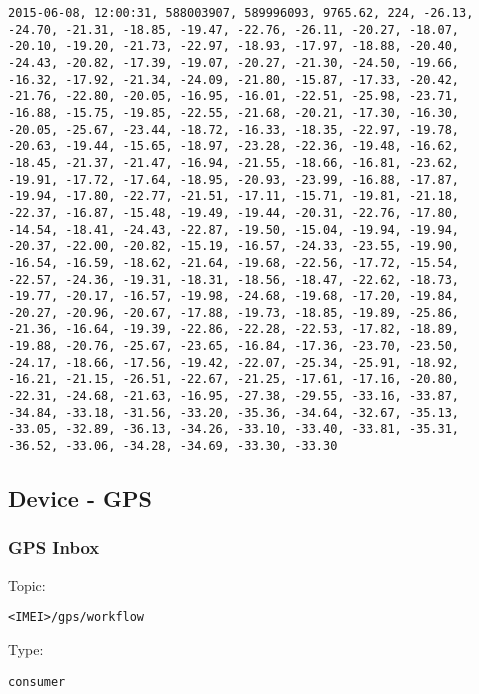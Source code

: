 \begin{lstlisting}
2015-06-08, 12:00:31, 588003907, 589996093, 9765.62, 224, -26.13, -24.70, -21.31, -18.85, -19.47, -22.76, -26.11, -20.27, -18.07, -20.10, -19.20, -21.73, -22.97, -18.93, -17.97, -18.88, -20.40, -24.43, -20.82, -17.39, -19.07, -20.27, -21.30, -24.50, -19.66, -16.32, -17.92, -21.34, -24.09, -21.80, -15.87, -17.33, -20.42, -21.76, -22.80, -20.05, -16.95, -16.01, -22.51, -25.98, -23.71, -16.88, -15.75, -19.85, -22.55, -21.68, -20.21, -17.30, -16.30, -20.05, -25.67, -23.44, -18.72, -16.33, -18.35, -22.97, -19.78, -20.63, -19.44, -15.65, -18.97, -23.28, -22.36, -19.48, -16.62, -18.45, -21.37, -21.47, -16.94, -21.55, -18.66, -16.81, -23.62, -19.91, -17.72, -17.64, -18.95, -20.93, -23.99, -16.88, -17.87, -19.94, -17.80, -22.77, -21.51, -17.11, -15.71, -19.81, -21.18, -22.37, -16.87, -15.48, -19.49, -19.44, -20.31, -22.76, -17.80, -14.54, -18.41, -24.43, -22.87, -19.50, -15.04, -19.94, -19.94, -20.37, -22.00, -20.82, -15.19, -16.57, -24.33, -23.55, -19.90, -16.54, -16.59, -18.62, -21.64, -19.68, -22.56, -17.72, -15.54, -22.57, -24.36, -19.31, -18.31, -18.56, -18.47, -22.62, -18.73, -19.77, -20.17, -16.57, -19.98, -24.68, -19.68, -17.20, -19.84, -20.27, -20.96, -20.67, -17.88, -19.73, -18.85, -19.89, -25.86, -21.36, -16.64, -19.39, -22.86, -22.28, -22.53, -17.82, -18.89, -19.88, -20.76, -25.67, -23.65, -16.84, -17.36, -23.70, -23.50, -24.17, -18.66, -17.56, -19.42, -22.07, -25.34, -25.91, -18.92, -16.21, -21.15, -26.51, -22.67, -21.25, -17.61, -17.16, -20.80, -22.31, -24.68, -21.63, -16.95, -27.38, -29.55, -33.16, -33.87, -34.84, -33.18, -31.56, -33.20, -35.36, -34.64, -32.67, -35.13, -33.05, -32.89, -36.13, -34.26, -33.10, -33.40, -33.81, -35.31, -36.52, -33.06, -34.28, -34.69, -33.30, -33.30
\end{lstlisting}

\subsection{Device - GPS}
\subsubsection{GPS Inbox}

Topic:
\begin{lstlisting}<IMEI>/gps/workflow\end{lstlisting}
Type:
\begin{lstlisting}consumer\end{lstlisting}





